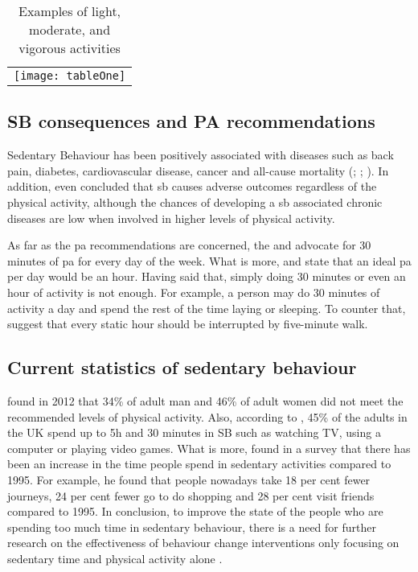     \begin{table}[ht]
        \centering
        \begin{tabular}{c}
            \texttt{[image: tableOne]}
        \end{tabular}
        \caption{Examples of light, moderate, and vigorous activities \citep{harvardthchanschoolofpublichealth2012}}
        \label{tab:activity-intensities}
    \end{table}
    
    \subsection{SB consequences and PA recommendations}
    \label{subsection:sb-consequences-and-pa-recommendations}
    Sedentary Behaviour has been positively associated with diseases such as back pain, diabetes, cardiovascular disease, cancer and all-cause mortality  (\citealp[2895–2905]{wilmot2012}; \citealp[123]{biswas2015}; \citealp[18]{departmentofhealth2010}). In addition, \citet[127]{biswas2015} even concluded that \gls{sb} causes adverse outcomes regardless of the physical activity, although the chances of developing a \gls{sb} associated chronic diseases are low when involved in higher levels of physical activity.
    
    As far as the \gls{pa} recommendations are concerned, the \citet[]{departmentofhealth2011} and \citet[]{townsend2015} advocate for 30 minutes of \gls{pa} for every day of the week. What is more, \citet[]{parkinson2016} and \citet[]{siddique2016} state that an ideal \gls{pa} per day would be an hour. Having said that, simply doing 30 minutes or even an hour of activity is not enough. For example, a person may do 30 minutes of activity a day and spend the rest of the time laying or sleeping. To counter that, \citet[]{swartz2011} suggest that every static hour should be interrupted by five-minute walk.
    
    \subsection{Current statistics of sedentary behaviour}
    \citet[19]{townsend2015} found in 2012 that 34\% of adult man and 46\% of adult women did not meet the recommended levels of physical activity. Also, according to \citet[81]{townsend2015}, 45\% of the adults in the UK spend up to 5h and 30 minutes in SB such as watching TV, using a computer or playing video games. What is more, \citet{swinford2014} found in a survey that there has been an increase in the time people spend in sedentary activities compared to 1995. For example, he found that people nowadays take 18 per cent fewer journeys, 24 per cent fewer go to do shopping and 28 per cent visit friends compared to 1995. In conclusion, to improve the state of the people who are spending too much time in sedentary behaviour, there is a need for further research on the effectiveness of behaviour change interventions only focusing on sedentary time and physical activity alone \citep[130]{biswas2015}.

